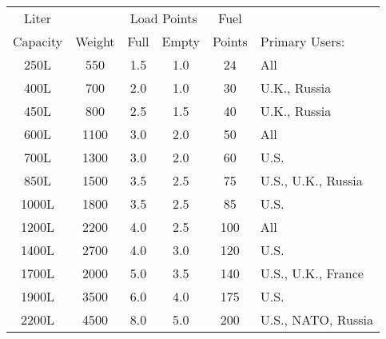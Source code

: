 

\begin{twocolumntablefloat}
\begin{twocolumntable}

\begin{tabular}{cccccl}
\toprule
Liter&&\multicolumn{2}{c}{Load Points}&Fuel\\
Capacity&Weight&Full&Empty&Points&Primary Users:\\
\midrule
\phantom{0}250L&\phantom{0}550&1.5&1.0&\phantom{0}24&All\\
\phantom{0}400L&\phantom{0}700&2.0&1.0&\phantom{0}30&U.K., Russia\\
\phantom{0}450L&\phantom{0}800&2.5&1.5&\phantom{0}40&U.K., Russia\\
\phantom{0}600L&\phantom{}1100&3.0&2.0&\phantom{0}50&All\\
\phantom{0}700L&\phantom{}1300&3.0&2.0&\phantom{0}60&U.S.\\
\phantom{0}850L&\phantom{}1500&3.5&2.5&\phantom{0}75&U.S., U.K., Russia\\
\phantom{}1000L&\phantom{}1800&3.5&2.5&\phantom{0}85&U.S.\\
\phantom{}1200L&\phantom{}2200&4.0&2.5&\phantom{}100&All\\
\phantom{}1400L&\phantom{}2700&4.0&3.0&\phantom{}120&U.S.\\
\phantom{}1700L&\phantom{}2000&5.0&3.5&\phantom{}140&U.S., U.K., France\\
\phantom{}1900L&\phantom{}3500&6.0&4.0&\phantom{}175&U.S.\\
\phantom{}2200L&\phantom{}4500&8.0&5.0&\phantom{}200&U.S., NATO, Russia\\
\bottomrule
\end{tabular}

\end{twocolumntable}
\end{twocolumntablefloat}